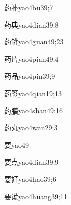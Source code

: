 \begin{verbete}{药补}{yao4bu3}{9;7}
\end{verbete}

\begin{verbete}{药典}{yao4dian3}{9;8}
\end{verbete}

\begin{verbete}{药罐}{yao4guan4}{9;23}
\end{verbete}

\begin{verbete}{药片}{yao4pian4}{9;4}
\end{verbete}

\begin{verbete}{药品}{yao4pin3}{9;9}
\end{verbete}

\begin{verbete}{药签}{yao4qian1}{9;13}
\end{verbete}

\begin{verbete}{药膳}{yao4shan4}{9;16}
\end{verbete}

\begin{verbete}{药丸}{yao4wan2}{9;3}
\end{verbete}

\begin{verbete}{要}{yao4}{9}
\end{verbete}

\begin{verbete}{要点}{yao4dian3}{9;9}
\end{verbete}

\begin{verbete}{要好}{yao4hao3}{9;6}
\end{verbete}

\begin{verbete}{要谎}{yao4huang3}{9;11}
\end{verbete}


